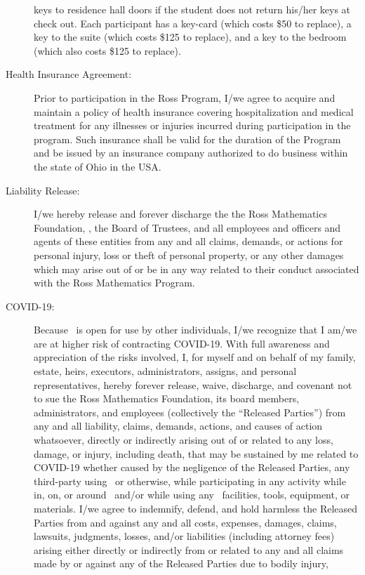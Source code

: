 \documentclass{ross}
\begin{document}
\begin{description}
  keys to residence hall doors if the student does not return his/her
  keys at check out.  Each participant has a key-card (which costs
  \$50 to replace), a key to the suite (which costs
  \$125 to replace), and a key to the bedroom (which also costs \$125
  to replace).
\item[Health Insurance Agreement:] Prior to participation in the Ross
  Program, I/we agree to acquire and maintain a policy of health
  insurance covering hospitalization and medical treatment for any
  illnesses or injuries incurred during participation in the
  program. Such insurance shall be valid for the duration of the
  Program and be issued by an insurance company authorized to do
  business within the state of Ohio in the USA.
\item[Liability Release:] I/we hereby release and forever discharge
  the the Ross Mathematics Foundation, 
  \campus, the Board  of Trustees, and 
  all employees and officers and agents of these entities from any
  and all claims, demands, or actions for personal injury, loss or
  theft of personal property, or any other damages which may arise out
  of or be in any way related to their conduct associated with the
  Ross Mathematics Program.
  \item[COVID-19:] Because \campus\ is open for use
by other individuals, I/we recognize that I am/we are at higher risk of contracting COVID-19. With full awareness and appreciation of
the risks involved, I, for myself and on behalf of my family, estate, heirs, executors, administrators, assigns, and
personal representatives, hereby forever release, waive, discharge, and covenant not to sue the Ross Mathematics Foundation, its
board members, administrators, and employees (collectively the  ``Released Parties'') from
any and all liability, claims, demands, actions, and causes of action whatsoever, directly or indirectly arising out of or
related to any loss, damage, or injury, including death, that may be sustained by me related to COVID-19 whether
caused by the negligence of the Released Parties, any third-party using \campus\, or otherwise, while
participating in any activity while in, on, or around \campus\ and/or while using any \campus\
facilities, tools, equipment, or materials. I/we agree to indemnify, defend, and hold harmless the Released Parties from and against any and all costs, expenses,
damages, claims, lawsuits, judgments, losses, and/or liabilities (including attorney fees) arising either directly or
indirectly from or related to any and all claims made by or against any of the Released Parties due to bodily injury,

\end{description}
\end{document}
